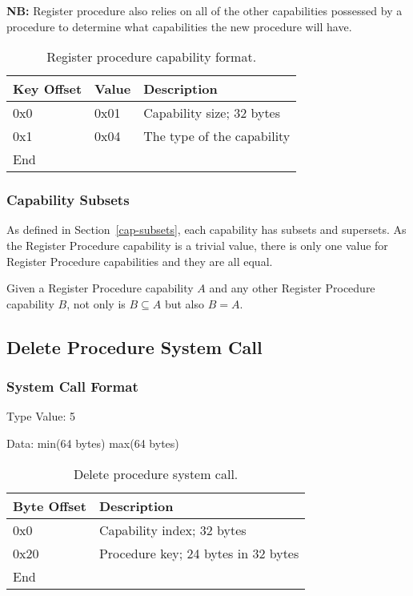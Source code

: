 \documentclass[english,a4paper]{article}
\let\oldparagraph\subsubsection
\renewcommand{\subsubsection}[1]{\oldparagraph{#1}\mbox{}}
\begin{document}
\textbf{NB:} Register procedure also relies on all of the other capabilities
possessed by a procedure to determine what capabilities the new procedure will
have.

\begin{table}[H]
  \caption{Register procedure capability format.}
  \centering{}%
  \begin{tabular}{l|l|p{}}
    \hline
    Key Offset & Value & Description\tabularnewline
    \hline
    \hline
    0x0 & 0x01 & Capability size; 32 bytes \tabularnewline
    0x1 & 0x04 & The type of the capability \tabularnewline
    \hline
    End &  \tabularnewline
    \hline
  \end{tabular}
\end{table}

\subsubsection{Capability Subsets}
As defined in Section~\ref{cap-subsets}, each capability has subsets and
supersets. As the Register Procedure capability is a trivial value, there is
only one value for Register Procedure capabilities and they are all equal.

Given a Register Procedure capability $A$ and any other Register Procedure
capability $B$, not only is $B \subseteq A$ but also $B = A$.

\subsection{Delete Procedure System Call}

\subsubsection{System Call Format}
Type Value: 5

Data: min(64 bytes) max(64 bytes)

\begin{table}[H]
  \caption{Delete procedure system call.}
  \centering{}%
  \begin{tabular}{l|p{}}
    \hline
    Byte Offset & Description\tabularnewline
    \hline
    \hline
    0x0 & Capability index; 32 bytes \tabularnewline
    0x20 & Procedure key; 24 bytes in 32 bytes \tabularnewline
    \hline
    End &  \tabularnewline
    \hline
  \end{tabular}
\end{table}
\end{document}
